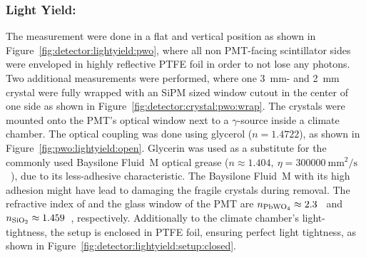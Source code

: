 \subsubsection{Light Yield: }
The  measurement were done in a flat and vertical position as shown in Figure~\ref{fig:detector:lightyield:pwo}, where all non PMT-facing scintillator sides were enveloped in highly reflective PTFE foil in order to not lose any photons.
Two additional measurements were performed, where one \SI{3}{\milli\meter}- and \SI{2}{\milli\meter} crystal were fully wrapped with an SiPM sized window cutout in the center of one side  as shown in Figure~\ref{fig:detector:crystal:pwo:wrap}.
The  crystals were mounted onto the PMT's optical window next to a  $\gamma$-source inside a climate chamber.
The optical coupling was done using glycerol ($n=1.4722$), as shown in Figure~\ref{fig:pwo:lightyield:open}.
Glycerin was used as a substitute for the commonly used Baysilone\textsuperscript{{\textregistered}} Fluid~M optical grease ($n\approx 1.404,~\eta=\SI{300000}{\milli\meter^2\per\second}$~\cite{bayer:baysilone}), due to its less-adhesive characteristic.
The Baysilone\textsuperscript{{\textregistered}} Fluid~M with its high adhesion might have lead to damaging the fragile crystals during removal.
The refractive index of  and the  glass window of the \gls{PMT} are $n_{\ce{PbWO4}}\approx2.3$~\cite{cms:tdr} and $n_{\ce{SiO2}}\approx1.459$~\cite{Malitson:65}, respectively.
Additionally to the climate chamber's light-tightness, the setup is enclosed in PTFE foil, ensuring perfect light tightness, as shown in Figure~\ref{fig:detector:lightyield:setup:closed}.

\begin{figure}[h!]
    \centering
    \begin{minipage}[t]{.5\textwidth}
        \centering
        \captionsetup{width=.9\linewidth}
        \label{fig:pwo:lightyield:open}
    \end{minipage}%
    \begin{minipage}[t]{.5\textwidth}
        \centering
        \captionsetup{width=.9\linewidth}
        \label{fig:pwo:lightyield:closed}
    \end{minipage}
\end{figure}

